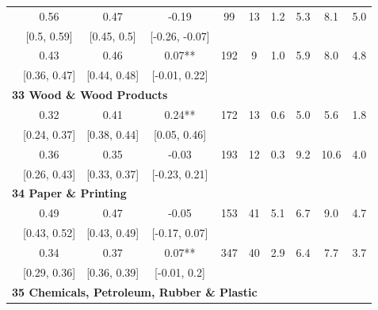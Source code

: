 \documentclass[
  12pt]{article}
\theoremstyle{definition}
\theoremstyle{remark}
\begin{document}
\begin{table}
{\begin{tabular}[t]{c|c|c|c|c|c|c|c|c|c}
\cline{1-10}
\hspace{1em} & 0.56 & 0.47 & -0.19 & 99 & 13 & 1.2 & 5.3 & 8.1 & 5.0\\
\cline{2-10}
\hspace{1em}\multirow[t]{-2}{*}{\centering\arraybackslash 323} & [0.5, 0.59] & [0.45, 0.5] & [-0.26, -0.07] &  &  &  &  &  & \\
\cline{1-10}
\hspace{1em} & 0.43 & 0.46 & 0.07** & 192 & 9 & 1.0 & 5.9 & 8.0 & 4.8\\
\cline{2-10}
\hspace{1em}\multirow[t]{-2}{*}{\centering\arraybackslash 324} & [0.36, 0.47] & [0.44, 0.48] & [-0.01, 0.22] &  &  &  &  &  & \\
\cline{1-10}
\multicolumn{10}{l}{\textbf{33 Wood \& Wood Products}}\\
\hline
\hspace{1em} & 0.32 & 0.41 & 0.24** & 172 & 13 & 0.6 & 5.0 & 5.6 & 1.8\\
\cline{2-10}
\hspace{1em}\multirow[t]{-2}{*}{\centering\arraybackslash 331} & [0.24, 0.37] & [0.38, 0.44] & [0.05, 0.46] &  &  &  &  &  & \\
\cline{1-10}
\hspace{1em} & 0.36 & 0.35 & -0.03 & 193 & 12 & 0.3 & 9.2 & 10.6 & 4.0\\
\cline{2-10}
\hspace{1em}\multirow[t]{-2}{*}{\centering\arraybackslash 332} & [0.26, 0.43] & [0.33, 0.37] & [-0.23, 0.21] &  &  &  &  &  & \\
\cline{1-10}
\multicolumn{10}{l}{\textbf{34 Paper \& Printing}}\\
\hline
\hspace{1em} & 0.49 & 0.47 & -0.05 & 153 & 41 & 5.1 & 6.7 & 9.0 & 4.7\\
\cline{2-10}
\hspace{1em}\multirow[t]{-2}{*}{\centering\arraybackslash 341} & [0.43, 0.52] & [0.43, 0.49] & [-0.17, 0.07] &  &  &  &  &  & \\
\cline{1-10}
\hspace{1em} & 0.34 & 0.37 & 0.07** & 347 & 40 & 2.9 & 6.4 & 7.7 & 3.7\\
\cline{2-10}
\hspace{1em}\multirow[t]{-2}{*}{\centering\arraybackslash 342} & [0.29, 0.36] & [0.36, 0.39] & [-0.01, 0.2] &  &  &  &  &  & \\
\cline{1-10}
\multicolumn{10}{l}{\textbf{35 Chemicals, Petroleum, Rubber \& Plastic}}\\

\end{tabular}}
\end{table}
\end{document}
